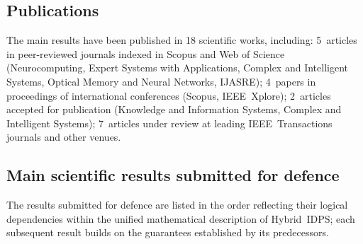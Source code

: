 \documentclass[12pt,a5paper]{article}
\begin{document}
\subsection*{Publications}

The main results have been published in 18 scientific works,
including: 5~articles in peer-reviewed journals indexed in
Scopus and Web of Science (Neurocomputing, Expert Systems with
Applications, Complex and Intelligent Systems, Optical Memory
and Neural Networks, IJASRE); 4~papers in proceedings of
international conferences (Scopus, IEEE~Xplore); 2~articles
accepted for publication (Knowledge and Information Systems,
Complex and Intelligent Systems); 7~articles under review at
leading IEEE~Transactions journals and other venues.

\subsection*{Main scientific results submitted for defence}

The results submitted for defence are listed in the order
reflecting their logical dependencies within the unified
mathematical description of Hybrid~IDPS; each subsequent result
builds on the guarantees established by its predecessors.
\end{document}
